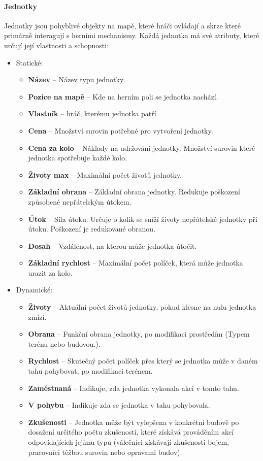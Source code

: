 \paragraph{Jednotky}
Jednotky jsou pohyblivé objekty na mapě, které hráči ovládají a skrze které primárně interagují s herními mechanismy. Každá jednotka má své atributy, které určují její vlastnosti a schopnosti:
\begin{itemize}
    \item Statické:
    \begin{itemize}
        \item \textbf{Název} -- Název typu jednotky.
        \item \textbf{Pozice na mapě} -- Kde na herním poli se jednotka nachází.
        \item \textbf{Vlastník} – hráč, kterému jednotka patří.
        \item \textbf{Cena} -- Množství surovin potřebné pro vytvoření jednotky.
        \item \textbf{Cena za kolo} -- Náklady na udržování jednotky. Množství surovin které jednotka spotřebuje každé kolo.
        \item \textbf{Životy max} -- Maximální počet životů jednotky.
         \item \textbf{Základní obrana} -- Základní obrana jednotky. Redukuje poškození způsobené nepřátelským útokem.
        \item \textbf{Útok} -- Síla útoku. Určuje o kolik se sníží životy nepřátelské jednotky při útoku. Poškození je redukované obranou. 
        \item \textbf{Dosah} -- Vzdálenost, na kterou může jednotka útočit.
        \item \textbf{Základní rychlost} – Maximální počet políček, která může jednotka urazit za kolo.
    \end{itemize}
    \item Dynamické:
    \begin{itemize}
        \item \textbf{Životy} -- Aktuální počet životů jednotky, pokud klesne na nulu jednotka zmizí.
        \item \textbf{Obrana} -- Funkční obrana jednotky, po modifikaci prostředím (Typem terénu nebo budovou.).
        \item \textbf{Rychlost} -- Skutečný počet políček přes který se jednotka může v daném tahu pohybovat, po modifikaci terénem.
        \item \textbf{Zaměstnaná} -- Indikuje, zda jednotka vykonala akci v tomto tahu.
        \item \textbf{V pohybu} -- Indikuje zda se jednotka v tahu pohybovala.
        \item \textbf{Zkušenosti} -- Jednotka může být vylepšena v konkrétní budově po dosažení určitého počtu zkušeností, které získává prováděním akcí odpovídajících jejímu typu (válečníci získávají zkušenosti bojem, pracovníci těžbou surovin nebo opravami budov).
    \end{itemize}
\end{itemize}

